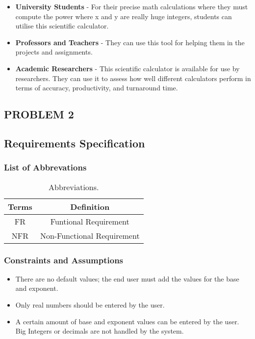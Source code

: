 \documentclass[a4paper,12pt]{article}
\begin{document}
\begin{itemize}
    \item \textbf{University Students} - For their precise math calculations where they must compute the power where x and y are really huge integers, students can utilise this scientific calculator.
    
    \item \textbf{Professors and Teachers} - They can use this tool for helping them in the projects and assignments.

    \item \textbf{Academic Researchers} - This scientific calculator is available for use by researchers. They can use it to assess how well different calculators perform in terms of accuracy, productivity, and turnaround time.

\end{itemize}
\newpage
\begin{center}
    \chapter{\Large\textbf{PROBLEM 2}}
\end{center}
\section{Requirements Specification}
\subsection{List of Abbrevations}


\begin{table}[htp]
	\centering
	\caption{Abbreviations.} \vspace{0.5cm} \label{tab:definition_table} 
	\begin{tabular}{||c|c||}
		\hline  \hline \textbf{Terms} & \textbf{Definition} \\
		\hline \hline
		FR & Funtional Requirement  \\ 
		\hline
		NFR & Non-Functional Requirement  \\
		\hline
		
	\end{tabular}
\end{table}



\subsection{Constraints and Assumptions}
\begin{itemize}
	\item There are no default values; the end user must add the values for the base and exponent.
	\item Only real numbers should be entered by the user.
	\item A certain amount of base and exponent values can be entered by the user. Big Integers or decimals are not handled by the system.
\end{itemize}
\end{document}
